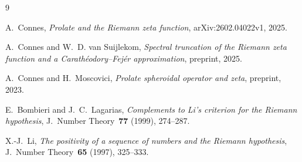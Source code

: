 \documentclass[12pt,a4paper]{article}
\theoremstyle{definition}
\theoremstyle{remark}
\begin{document}
\begin{thebibliography}{9}

A.~Connes, \emph{Prolate and the Riemann zeta function}, arXiv:2602.04022v1, 2025.

A.~Connes and W.~D. van Suijlekom, \emph{Spectral truncation of the Riemann zeta function and a Carath\'eodory--Fej\'er approximation}, preprint, 2025.

A.~Connes and H.~Moscovici, \emph{Prolate spheroidal operator and zeta}, preprint, 2023.

E.~Bombieri and J.~C.~Lagarias, \emph{Complements to Li's criterion for the Riemann hypothesis}, J.~Number Theory~\textbf{77} (1999), 274--287.

X.-J.~Li, \emph{The positivity of a sequence of numbers and the Riemann hypothesis}, J.~Number Theory~\textbf{65} (1997), 325--333.

\end{thebibliography}
\end{document}

